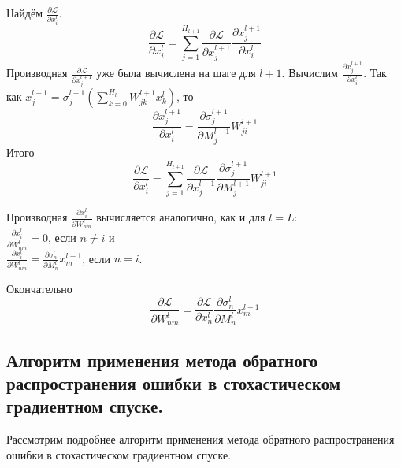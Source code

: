 Найдём $\frac{\partial \mathcal{L}}{\partial x^l_i}$.
$$
\frac{\partial \mathcal{L}}{\partial x^l_i} = \sum\limits_{j = 1}^{H_{l+1}} \frac{\partial \mathcal{L}}{\partial x^{l+1}_j} \frac{\partial x^{l+1}_j}{\partial x^{l}_i}
$$
Производная $\frac{\partial \mathcal{L}}{\partial x^{l+1}_j}$ уже была вычислена на шаге для $l+1$. Вычислим $\frac{\partial x^{l+1}_j}{\partial x^{l}_i}$. Так как $x^{l+1}_j = \sigma^{l+1}_j\left(\sum\limits_{k = 0}^{H_{l}} W^{l+1}_{jk} x^{l}_k\right)$, то
$$
\frac{\partial x^{l+1}_j}{\partial x^{l}_i} = \frac{\partial \sigma^{l+1}_{j}}{\partial M^{l+1}_j} W^{l+1}_{ji}
$$
Итого
$$
\frac{\partial \mathcal{L}}{\partial x^l_i} = \sum\limits_{j = 1}^{H_{l+1}} \frac{\partial \mathcal{L}}{\partial x^{l+1}_j} \frac{\partial \sigma^{l+1}_{j}}{\partial M^{l+1}_j} W^{l+1}_{ji}
$$

Производная $\frac{\partial x^l_i}{\partial W^{l}_{nm}}$ вычисляется аналогично, как и для $l = L$: \\
$\frac{\partial x^l_i}{\partial W^l_{nm}} = 0$, если $n \neq i$ и \\
$\frac{\partial x^l_i}{\partial W^l_{nm}} = \frac{\partial \sigma^l_n}{\partial M^l_n} x^{l-1}_m$, если $n = i$.

Окончательно
$$
\frac{\partial \mathcal{L}}{\partial W^l_{nm}} = \frac{\partial \mathcal{L}}{\partial x^l_n} \frac{\partial \sigma^l_n}{\partial M^l_n} x^{l-1}_m
$$

\subsection{Алгоритм применения метода обратного распространения ошибки в стохастическом градиентном спуске.}

Рассмотрим подробнее алгоритм применения метода обратного распространения ошибки в стохастическом градиентном спуске.

